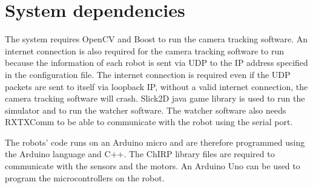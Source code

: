 \chapter{System dependencies}

The system requires OpenCV and Boost to run the camera tracking software. An internet connection is also required for the camera tracking software to run because the information of each robot is sent via UDP to the IP address specified in the configuration file. The internet connection is required even if the UDP packets are sent to itself via loopback IP, without a valid internet connection, the camera tracking software will crash.
Slick2D java game library is used to run the simulator and to run the watcher software. 
The watcher software also needs RXTXComm to be able to communicate with the robot using the serial port.

The robots' code runs on an Arduino micro and are therefore programmed using the Arduino language and C++. The ChIRP library files are required to communicate with the sensors and the motors. An Arduino Uno can be used to program the microcontrollers on the robot.